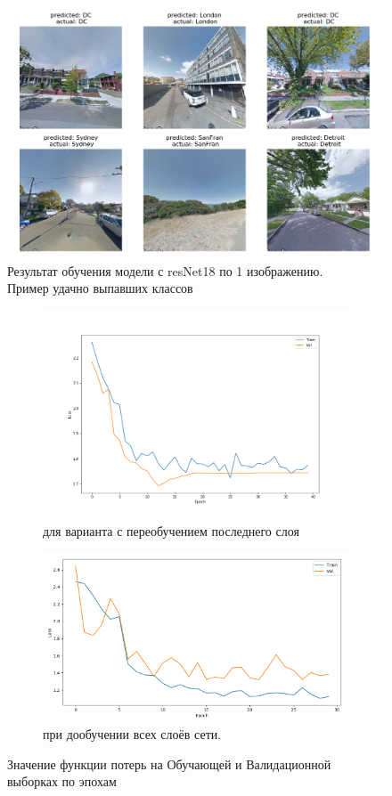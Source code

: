 \begin{figure}
	\centering
	\includegraphics[width=0.9\linewidth]{img/res1im}
	\caption{Результат обучения модели с resNet18 по 1 изображению. \\
			 Пример удачно выпавших классов}
	\label{fig:res1im}
\end{figure}
\begin{figure}[h]
	\centering
\begin{subfigure}{0.4\linewidth}
	\centering
	\includegraphics[width=0.9\linewidth]{img/train1im}
	\caption{ для варианта с переобучением последнего слоя}
	\label{fig:train1im}
\end{subfigure}
\begin{subfigure}{0.4\linewidth}
	\centering
	\includegraphics[width=1\linewidth]{img/train1im2}
	\caption{при дообучении всех слоёв сети.}
	\label{fig:train1imretr}
\end{subfigure}
\caption{Значение функции потерь на Обучающей и Валидационной выборках по эпохам }
\end{figure}

